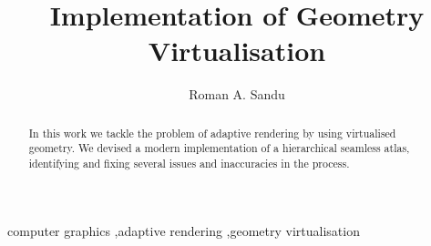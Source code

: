 \documentclass[12pt]{elsarticle}
\title{Implementation of Geometry Virtualisation}
\author[1]{Roman A. Sandu}
\begin{document}
\begin{abstract}
In this work we tackle the problem of adaptive rendering by using virtualised geometry. We devised a modern implementation of a hierarchical seamless atlas, identifying and fixing several issues and inaccuracies in the process.
\end{abstract}
\begin{keyword}
computer graphics \sep adaptive rendering \sep geometry virtualisation
\end{keyword}

\maketitle


\lipsum[2-8]
\cite{niski2007multi}


\end{document}
